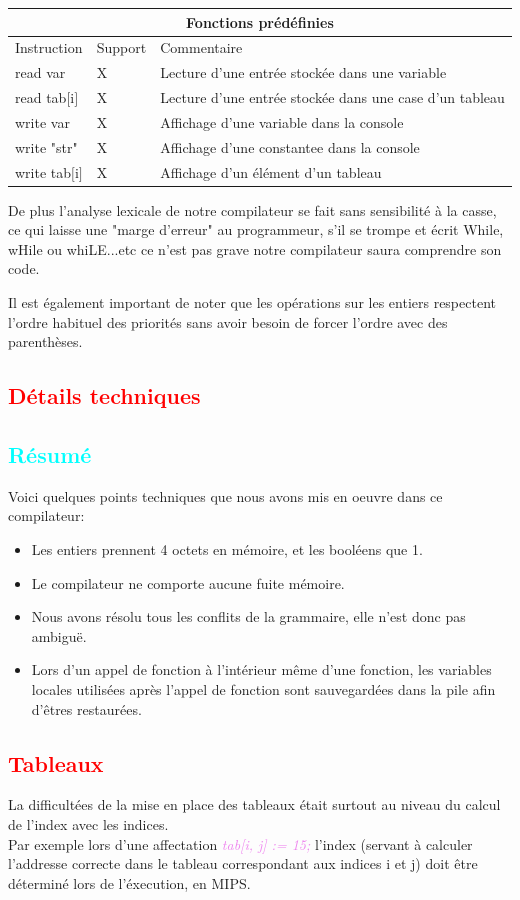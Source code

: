\documentclass[a4paper]{article}
\let\oldtextit\textit
\renewcommand{\textit}[1]{\textcolor{violet}{\oldtextit{#1}}}
\newcommand{\csection}[1]{\textcolor{red}{\section{#1}}}
\newcommand{\csubsection}[1]{\textcolor{cyan}{\subsection{#1}}}
\begin{document}
\begin{center}
\begin{tabular}{|l|l|l|}
  \hline
  \multicolumn{3}{|c|}{Fonctions prédéfinies} \\
  \hline
  Instruction & Support & Commentaire \\
  \hline
  read var & X & Lecture d'une entrée stockée dans une variable \\
  read tab$[$i$]$ & X & Lecture d'une entrée stockée dans une case d'un tableau \\
  write var & X & Affichage d'une variable dans la console \\
  write "str" & X & Affichage d'une constantee dans la console \\
  write tab$[$i$]$ & X & Affichage d'un élément d'un tableau \\
  \hline
\end{tabular}

\end{center}

De plus l'analyse lexicale de notre compilateur se fait sans sensibilité à la casse, ce qui laisse une "marge d'erreur" au programmeur, s'il se trompe et écrit While, wHile ou whiLE...etc ce n'est pas grave notre compilateur saura comprendre son code.

Il est également important de noter que les opérations sur les entiers respectent l'ordre habituel des priorités sans avoir besoin de forcer l'ordre avec des parenthèses.

\csection{Détails techniques}

\csubsection{Résumé}

Voici quelques points techniques que nous avons mis en oeuvre dans ce compilateur:
\begin{itemize}
    \item Les entiers prennent 4 octets en mémoire, et les booléens que 1.
    \item Le compilateur ne comporte aucune fuite mémoire.
    \item Nous avons résolu tous les conflits de la grammaire, elle n'est donc pas ambiguë.
    \item Lors d'un appel de fonction à l'intérieur même d'une fonction, les variables locales utilisées après l'appel de fonction sont sauvegardées dans la pile afin d'êtres restaurées.
\end{itemize}

\csection{Tableaux}

La difficultées de la mise en place des tableaux était surtout au niveau du calcul de l'index avec les indices.\\
Par exemple lors d'une affectation \textit{tab[i, j] := 15;} l'index (servant à calculer l'addresse correcte dans le tableau correspondant aux indices i et j) doit être déterminé lors de l'éxecution, en MIPS.
\end{document}
